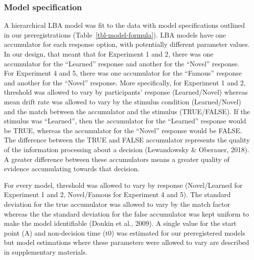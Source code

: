 \documentclass[
  letterpaper,
  DIV=11,
  numbers=noendperiod]{scrartcl}
\begin{document}
\subsubsection{Model specification}\label{model-specification}

A hierarchical LBA model was fit to the data with model specifications
outlined in our preregistrations (Table~\ref{tbl-model-formula}). LBA
models have one accumulator for each response option, with potentially
different parameter values. In our design, that meant that for
Experiment 1 and 2, there was one accumulator for the ``Learned''
response and another for the ``Novel'' response. For Experiment 4 and 5,
there was one accumulator for the ``Famous'' response and another for
the ``Novel'' response. More specifically, for Experiment 1 and 2,
threshold was allowed to vary by participants' response (Learned/Novel)
whereas mean drift rate was allowed to vary by the stimulus condition
(Learned/Novel) and the match between the accumulator and the stimulus
(TRUE/FALSE). If the stimulus was ``Learned'', then the accumulator for
the ``Learned'' response would be TRUE, whereas the accumulator for the
``Novel'' response would be FALSE. The difference between the TRUE and
FALSE accumulator represents the quality of the information processing
about a decision (Lewandowsky \& Oberauer, 2018). A greater difference
between these accumulators means a greater quality of evidence
accumulating towards that decision.

For every model, threshold was allowed to vary by response
(Novel/Learned for Experiment 1 and 2, Novel/Famous for Experiment 4 and
5). The standard deviation for the true accumulator was allowed to vary
by the match factor whereas the the standard deviation for the false
accumulator was kept uniform to make the model identifiable (Donkin et
al., 2009). A single value for the start point (A) and non-decision time
(t0) was estimated for our preregistered models but model estimations
where these parameters were allowed to vary are described in
supplementary materials.
\end{document}
